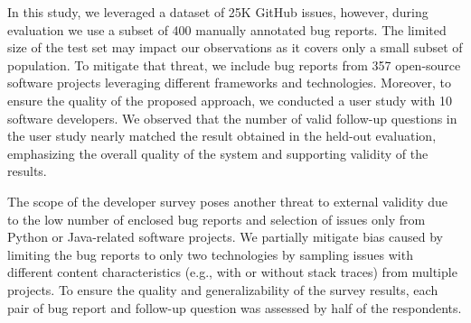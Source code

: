 In this study, we leveraged a dataset of 25K GitHub issues, however, during evaluation we use a subset of 400 manually annotated bug reports. The limited size of the test set may impact our observations as it covers only a small subset of population. To mitigate that threat, we include bug reports from 357 open-source software projects leveraging different frameworks and technologies. Moreover, to ensure the quality of the proposed approach, we conducted a user study with 10 software developers. We observed that the number of valid follow-up questions in the user study nearly matched the result obtained in the held-out evaluation, emphasizing the overall quality of the system and supporting validity of the results.

The scope of the developer survey poses another threat to external validity due to the low number of enclosed bug reports and selection of issues only from Python or Java-related software projects. We partially mitigate bias caused by limiting the bug reports to only two technologies by sampling issues with different content characteristics (e.g., with or without stack traces) from multiple projects.  To ensure the quality and generalizability of the survey results, each pair of bug report and follow-up question was assessed by half of the respondents.
